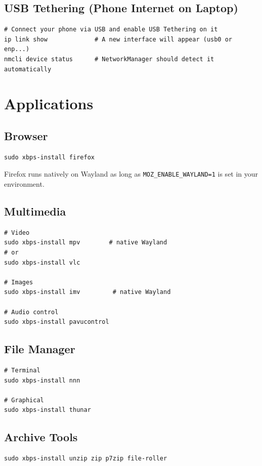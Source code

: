 \documentclass[12pt, a4paper]{book}
\begin{document}
\section{USB Tethering (Phone Internet on Laptop)}
\begin{lstlisting}
# Connect your phone via USB and enable USB Tethering on it
ip link show             # A new interface will appear (usb0 or enp...)
nmcli device status      # NetworkManager should detect it automatically
\end{lstlisting}

\chapter{Applications}

\section{Browser}
\begin{lstlisting}
sudo xbps-install firefox
\end{lstlisting}
Firefox runs natively on Wayland as long as \texttt{MOZ\_ENABLE\_WAYLAND=1} is set in your environment.

\section{Multimedia}
\begin{lstlisting}
# Video
sudo xbps-install mpv        # native Wayland
# or
sudo xbps-install vlc

# Images
sudo xbps-install imv         # native Wayland

# Audio control
sudo xbps-install pavucontrol
\end{lstlisting}

\section{File Manager}
\begin{lstlisting}
# Terminal
sudo xbps-install nnn

# Graphical
sudo xbps-install thunar
\end{lstlisting}

\section{Archive Tools}
\begin{lstlisting}
sudo xbps-install unzip zip p7zip file-roller
\end{lstlisting}
\end{document}
